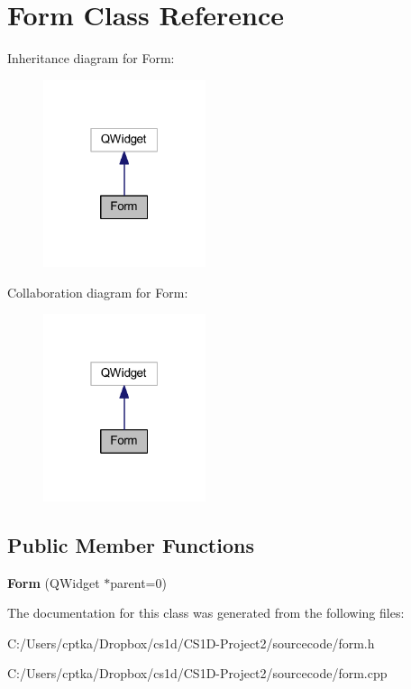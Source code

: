 \hypertarget{class_form}{}\section{Form Class Reference}
\label{class_form}


Inheritance diagram for Form\+:
\nopagebreak
\begin{figure}[H]
\begin{center}
\leavevmode
\includegraphics[width=135pt]{class_form__inherit__graph}
\end{center}
\end{figure}


Collaboration diagram for Form\+:
\nopagebreak
\begin{figure}[H]
\begin{center}
\leavevmode
\includegraphics[width=135pt]{class_form__coll__graph}
\end{center}
\end{figure}
\subsection*{Public Member Functions}
\begin{DoxyCompactItemize}
\item 
\mbox{\label{class_form_a9a921e26a02f23bffdea4330d6795796}} 
{\bfseries Form} (Q\+Widget $\ast$parent=0)
\end{DoxyCompactItemize}


The documentation for this class was generated from the following files\+:\begin{DoxyCompactItemize}
\item 
C\+:/\+Users/cptka/\+Dropbox/cs1d/\+C\+S1\+D-\/\+Project2/sourcecode/form.\+h\item 
C\+:/\+Users/cptka/\+Dropbox/cs1d/\+C\+S1\+D-\/\+Project2/sourcecode/form.\+cpp\end{DoxyCompactItemize}
